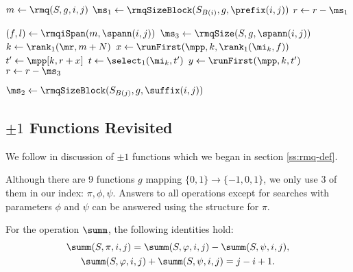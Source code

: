 \begin{algorithm}
\begin{algorithmic}
	\State $m \gets \rmq(S, g, i, j)$
	 
		\State $\ms_1 \gets \rmqSizeBlock(S_{B(i)}, g, \prefix(i, j))$ 
			\State {}
		\Else
			\State $r \gets r - \ms_1$
		\EndIf
	\EndIf
	
	\State $(f, l) \gets \rmqiSpan(m, \spann(i, j))$
	 
		\State $\ms_3 \gets \rmqSize(S, g, \spann(i, j))$
			\State $k \gets \rank_1(\mr, m + N)$ 
			\State $x \gets \runFirst(\mpp, k, \rank_1(\mi_k, f))$ 
			\State $t' \gets \mpp[k, r + x]$
			\State $t \gets \select_1(\mi_k, t')$ 
			\State $y \gets \runFirst(\mpp, k, t')$ 
			\State {}
		\Else
			\State $r \gets r - \ms_3$
		\EndIf
	\EndIf

	 
		\State $\ms_2 \gets \rmqSizeBlock(S_{B(j)}, g, \suffix(i, j))$ 
			\State {}
		\Else
			\State {}
		\EndIf
	\EndIf
\EndFunction
\end{algorithmic}
\end{algorithm}

\subsection{$\pm 1$ Functions Revisited}

We follow in discussion of $\pm 1$ functions which we began in section \ref{ss:rmq-def}.

Although there are 9 functions $g$ mapping $\{0, 1\} \to \{-1, 0, 1\}$, we only use 3 of them in our index: $\pi, \phi, \psi$.
Answers to all operations except for searches with parameters $\phi$ and $\psi$ can be answered using the structure for $\pi$.

For the operation $\summ$, the following identities hold:
\begin{gather*}
	\summ(S, \pi, i, j) = \summ(S, \phi, i, j) - \summ(S, \psi, i, j), \\
	\summ(S, \phi, i, j) + \summ(S, \psi, i, j) = j - i + 1.
\end{gather*}

